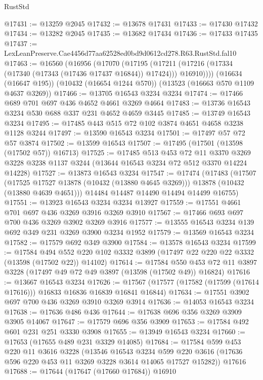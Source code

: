 \begin{lexlean}{RustStd}
\begin{coremodule}
@17431 := @13259 @2045
@17432 := @13678 @17431
@17433 := @17430 @17432
@17434 := @13282 @2045
@17435 := @13682 @17434
@17436 := @17433 @17435
@17437 := LexLeanPreserve.Cae4456d77aa62528ed0bd9d0612cd278.R63.RustStd.fal10
@17463 := @16560
    (@16956
      (@17070
        (@17195 (@17211 (@17216 (@17334 (@17340 (@17343 (@17436 @17437 @16844)) @17424))) @16910))))
    (@16634 (@16647 @195))
    (@10432 (@16654 @1244 @570))
    (@13523 (@16663 @570 @1109 @4637 @3269))
@17466 := @13705 @16543 @3234 @3234
@17474 := @17466 @689 @701 @697 @436 @4652 @4661 @3269 @4664
@17483 := @13736 @16543 @3234 @530 @688 @337 @231 @4652 @4659 @3445
@17485 := @13749 @16543 @3234
@17495 := @17485 @443 @515 @72 @102 @3874 @4651 @4658 @3238 @1128 @3244
@17497 := @13590 @16543 @3234
@17501 := @17497 @57 @72 @57 @3874
@17502 := @13599 @16543
@17507 := @17495 (@17501 (@13598 (@17502 @57)) @16713)
@17525 := @17485
    @513
    @453
    @72
    @11
    @3370
    @3269
    @3228
    @3238
    @1137
    @3244
    (@13644 @16543 @3234 @72 @512 @3370 @14224 @14228)
@17527 := @13873 @16543 @3234
@17547 := @17474
    (@17483
      (@17507
        (@17525 @17527 @13878 (@10432 (@13880 @4645 @3269)))
        @13878
        (@10432 (@13880 @4639 @4651)))
      @14484
      @14487
      @14490
      @14494
      @14499
      @16755)
@17551 := @13923 @16543 @3234 @3234 @13927
@17559 := @17551 @4661 @701 @697 @436 @3269 @3916 @3269 @3910
@17567 := @17466 @693 @697 @700 @436 @3269 @3902 @3269 @3916
@17577 := @13555 @16543 @3234 @139 @692 @349 @231 @3269 @3900 @3234 @1952
@17579 := @13569 @16543 @3234
@17582 := @17579 @692 @349 @3900
@17584 := @13578 @16543 @3234
@17599 := @17584
    @494
    @552
    @220
    @102
    @3332
    @3899
    (@17497 @22 @220 @22 @3332 (@13598 (@17502 @22)) @14102)
@17614 := @17584
    @550
    @453
    @72
    @11
    @3897
    @3228
    (@17497 @49 @72 @49 @3897 (@13598 (@17502 @49)) @16824)
@17616 := @13667 @16543 @3234
@17626 := @17567 (@17577 (@17582 (@17599 (@17614 @17616))) @16833 @16836 @16839 @16841 @16844)
@17634 := @17551 @3902 @697 @700 @436 @3269 @3910 @3269 @3914
@17636 := @14053 @16543 @3234
@17638 := @17636 @486 @436
@17644 := @17638 @696 @356 @3269 @3909 @3905 @14067
@17647 := @17579 @696 @356 @3909
@17653 := @17584 @492 @601 @231 @251 @3330 @3908
@17655 := @13949 @16543 @3234
@17660 := @17653 (@17655 @489 @231 @3329 @14085)
@17684 := @17584
    @599
    @453
    @220
    @11
    @3616
    @3228
    (@13546
      @16543
      @3234
      @599
      @220
      @3616
      (@17636 @596 @220 @453 @11 @3269 @3228 @3614 @14065 @17527 @15282))
    @17616
@17688 := @17644 (@17647 (@17660 @17684)) @16910

\end{coremodule}
\end{lexlean}
